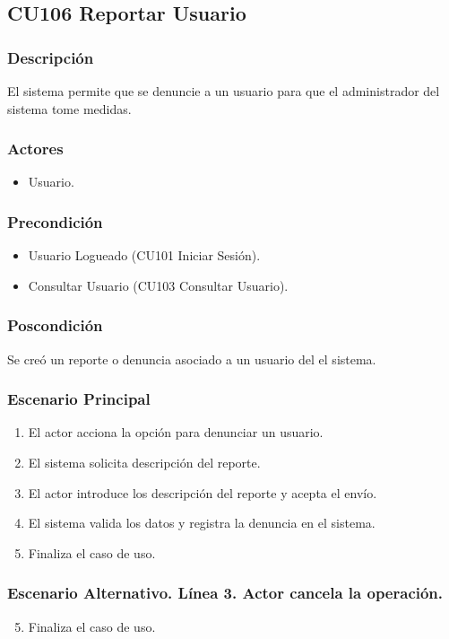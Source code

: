 \subsection{CU106 Reportar Usuario}
\subsubsection{Descripci\'{o}n}
El sistema permite que se denuncie a un usuario para que el administrador del sistema tome medidas.
\subsubsection{Actores}
\begin{itemize}
\item Usuario.
\end{itemize}
\subsubsection{Precondici\'{o}n}
\begin{itemize}
\item Usuario Logueado (CU101 Iniciar Sesi\'{o}n).
\item Consultar Usuario (CU103 Consultar Usuario).
\end{itemize}
\subsubsection{Poscondici\'{o}n}
Se cre\'{o} un reporte o denuncia asociado a un usuario del el sistema.
\subsubsection{Escenario Principal}
\begin{enumerate}
\item El actor acciona la opci\'{o}n para denunciar un usuario.
\item El sistema solicita descripci\'{o}n del reporte.
\item El actor introduce los descripci\'{o}n del reporte y acepta el env\'{i}o.
\item El sistema valida los datos y registra la denuncia en el sistema.
\item Finaliza el caso de uso.
\end{enumerate}
\subsubsection{Escenario Alternativo. L\'{i}nea 3. Actor cancela la operaci\'{o}n.}
\begin{enumerate}
\setcounter{enumi}{4}
\item Finaliza el caso de uso.
\end{enumerate}
